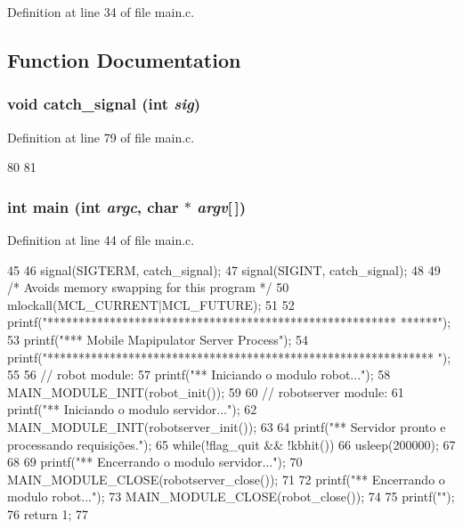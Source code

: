 Definition at line 34 of file main.c.

\subsection{Function Documentation}
\subsubsection[{catch\_\-signal}]{\setlength{\rightskip}{0pt plus 5cm}void catch\_\-signal (int {\em sig})}\label{main_8c_af2dc378d0481adcc49b61efb98493a9b}


Definition at line 79 of file main.c.


\begin{DoxyCode}
80 {
81 }
\end{DoxyCode}
\subsubsection[{main}]{\setlength{\rightskip}{0pt plus 5cm}int main (int {\em argc}, \/  char $\ast$ {\em argv}[$\,$])}\label{main_8c_a0ddf1224851353fc92bfbff6f499fa97}


Definition at line 44 of file main.c.


\begin{DoxyCode}
45 {       
46         signal(SIGTERM, catch_signal);
47         signal(SIGINT, catch_signal);
48 
49         /* Avoids memory swapping for this program */
50         mlockall(MCL_CURRENT|MCL_FUTURE);
51         
52         printf("\n\n\n\n*********************************************************
      ******");
53         printf("\n**** Mobile Mapipulator Server Process");
54         printf("\n***************************************************************
      \n");
55 
56         // robot module:
57         printf("\n*** Iniciando o modulo robot...");
58         MAIN_MODULE_INIT(robot_init());
59 
60         // robotserver module:
61         printf("\n*** Iniciando o modulo servidor...");
62         MAIN_MODULE_INIT(robotserver_init());
63         
64         printf("\n*** Servidor pronto e processando requisições.");
65         while(!flag_quit && !kbhit()){
66                 usleep(200000);
67         }
68 
69         printf("\n*** Encerrando o modulo servidor...");
70         MAIN_MODULE_CLOSE(robotserver_close());
71         
72         printf("\n*** Encerrando o modulo robot...");
73         MAIN_MODULE_CLOSE(robot_close());
74         
75         printf("\n\n");
76     return 1;
77 }
\end{DoxyCode}


